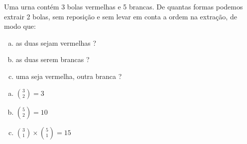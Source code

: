 \begin{ex}
 Uma urna contém 3 bolas vermelhas e 5 brancas. De quantas formas podemos extrair 2 bolas, sem reposição e sem levar em conta a ordem na extração, de modo que:
    \begin{enumerate}[(a)]
    \item as duas sejam vermelhas ?
    \item as duas serem brancas ?
    \item uma seja vermelha, outra branca ?
    \end{enumerate}
    
    \begin{sol}
        \phantom{A} 
     \begin{enumerate}[(a)]
     \item $\binom{3}{2}=3$
     \item $\binom{5}{2}=10$
     \item $\binom{3}{1} \times \binom{5}{1}=15$
    \end{enumerate}
        
    \end{sol}

\end{ex}